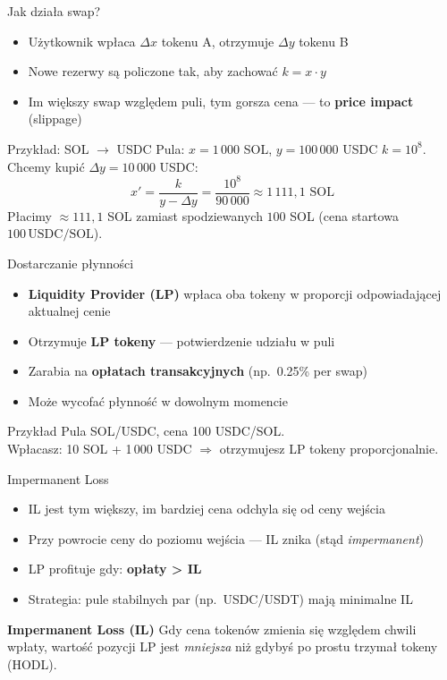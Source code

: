 \begin{frame}{Jak działa swap?}
  \begin{itemize}
    \item Użytkownik wpłaca $\Delta x$ tokenu A, otrzymuje $\Delta y$ tokenu B
    \item Nowe rezerwy są policzone tak, aby zachować $k = x \cdot y$
    \item Im większy swap względem puli, tym gorsza cena --- to \textbf{price impact} (slippage)
  \end{itemize}
  \vspace{0.3cm}
  \begin{exampleblock}{Przykład: SOL $\to$ USDC}
    Pula: $x = 1\,000$ SOL, $y = 100\,000$ USDC \quad $k = 10^8$.
    Chcemy kupić $\Delta y = 10\,000$ USDC:
    \[
      x' = \frac{k}{y - \Delta y} = \frac{10^8}{90\,000} \approx 1\,111{,}1 \text{ SOL}
    \]
    Płacimy $\approx 111{,}1$ SOL zamiast spodziewanych $100$ SOL
    (cena startowa $100\,\text{USDC/SOL}$).
  \end{exampleblock}
\end{frame}

\begin{frame}{Dostarczanie płynności}
  \begin{itemize}
    \item \textbf{Liquidity Provider (LP)} wpłaca oba tokeny w proporcji odpowiadającej aktualnej cenie
    \item Otrzymuje \textbf{LP tokeny} --- potwierdzenie udziału w puli
    \item Zarabia na \textbf{opłatach transakcyjnych} (np.\ 0.25\% per swap)
    \item Może wycofać płynność w dowolnym momencie
  \end{itemize}
  \vspace{0.3cm}
  \begin{exampleblock}{Przykład}
    Pula SOL/USDC, cena 100 USDC/SOL. \\
    Wpłacasz: 10 SOL + 1\,000 USDC $\Rightarrow$ otrzymujesz LP tokeny proporcjonalnie.
  \end{exampleblock}
\end{frame}

\begin{frame}{Impermanent Loss}
  \begin{itemize}
    \item IL jest tym większy, im bardziej cena odchyla się od ceny wejścia
    \item Przy powrocie ceny do poziomu wejścia --- IL znika (stąd \emph{impermanent})
    \item LP profituje gdy: \textbf{opłaty > IL}
    \item Strategia: pule stabilnych par (np.\ USDC/USDT) mają minimalne IL
  \end{itemize}
  \vspace{0.3cm}
  \begin{alertblock}{\textbf{Impermanent Loss (IL)}}
    Gdy cena tokenów zmienia się względem chwili wpłaty, wartość pozycji LP jest
    \emph{mniejsza} niż gdybyś po prostu trzymał tokeny (HODL).
  \end{alertblock}
\end{frame}

